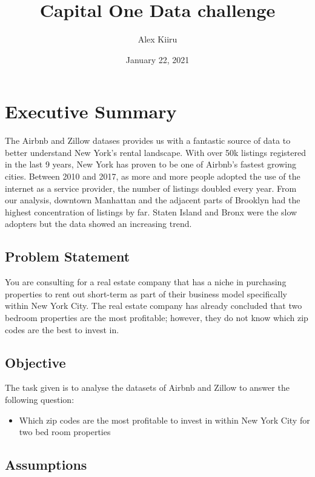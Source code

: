 \documentclass[
]{article}
\title{Capital One Data challenge}
\author{Alex Kiiru}
\date{January 22, 2021}
\providecommand{\tightlist}{%
  \setlength{\itemsep}{0pt}\setlength{\parskip}{0pt}}
\begin{document}
\maketitle

{
\setcounter{tocdepth}{2}
\tableofcontents
}
\hypertarget{executive-summary}{%
\section{Executive Summary}\label{executive-summary}}

The Airbnb and Zillow datases provides us with a fantastic source of
data to better understand New York's rental landscape. With over 50k
listings registered in the last 9 years, New York has proven to be one
of Airbnb's fastest growing cities. Between 2010 and 2017, as more and
more people adopted the use of the internet as a service provider, the
number of listings doubled every year. From our analysis, downtown
Manhattan and the adjacent parts of Brooklyn had the highest
concentration of listings by far. Staten Island and Bronx were the slow
adopters but the data showed an increasing trend.

\hypertarget{problem-statement}{%
\subsection{Problem Statement}\label{problem-statement}}

You are consulting for a real estate company that has a niche in
purchasing properties to rent out short-term as part of their business
model specifically within New York City. The real estate company has
already concluded that two bedroom properties are the most profitable;
however, they do not know which zip codes are the best to invest in.

\hypertarget{objective}{%
\subsection{Objective}\label{objective}}

The task given is to analyse the datasets of Airbnb and Zillow to answer
the following question:

\begin{itemize}
\tightlist
\item
  Which zip codes are the most profitable to invest in within New York
  City for two bed room properties
\end{itemize}

\hypertarget{assumptions}{%
\subsection{Assumptions}\label{assumptions}}
\end{document}
